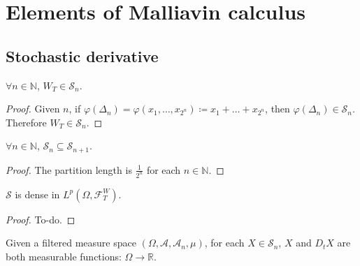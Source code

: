 \chapter{Elements of Malliavin calculus}

\section{Stochastic derivative}

\begin{proposition}
$\forall n \in \mathbb{N}$,  $W_{T} \in \mathcal{S}_{n}$. 
\end{proposition}

\begin{proof}
Given $n$, if $\varphi(\Delta_{n}) = \varphi(x_{1}, \dots, x_{2^{n}}) \coloneqq x_{1} + \dots + x_{2^{n}}$, then $\varphi(\Delta_{n}) \in \mathcal{S}_{n}$. Therefore $W_{T} \in \mathcal{S}_{n}$. 
\end{proof}

\begin{proposition}
$\forall n \in \mathbb{N}$,  $\mathcal{S}_{n} \subseteq \mathcal{S}_{n+1}$. 
\end{proposition}

\begin{proof}
The partition length is $\frac{1}{2^{n}}$ for each $n \in \mathbb{N}$. 
\end{proof}

\begin{proposition}
$\mathcal{S}$ is dense in $L^{p}(\Omega, \mathcal{F}^{W}_{T})$. 
\end{proposition}

\begin{proof}
To-do. 
\end{proof}

\begin{note}
Given a filtered measure space $(\Omega, \mathcal{A}, \mathcal{A}_{n}, \mu)$, for each $X \in \mathcal{S}_{n}$,  $X$ and $D_{t}X$ are both measurable functions: $\Omega \to \mathbb{R}$. 
\end{note}












